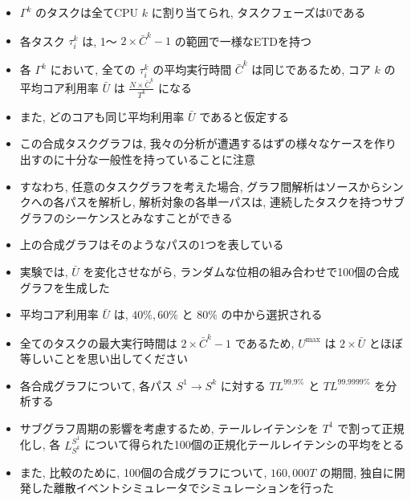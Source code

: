 \begin{frame}{}
    \begin{itemize}
        \item $\Gamma^{k}$ のタスクは全てCPU $k$ に割り当てられ, タスクフェーズは0である
\item 各タスク $\tau_{i}^{k}$ は, 1～ $2 \times \bar{C}^{k}-1$ の範囲で一様なETDを持つ
\item 各 $\Gamma^{k}$ において, 全ての $\tau_{i}^{k}$ の平均実行時間 $\bar{C}^{k}$ は同じであるため, コア $k$ の平均コア利用率 $\bar{U}$ は $\frac{N \times \bar{C}^{k}}{T^{k}}$ になる
\item また, どのコアも同じ平均利用率 $\bar{U}$ であると仮定する
\item この合成タスクグラフは, 我々の分析が遭遇するはずの様々なケースを作り出すのに十分な一般性を持っていることに注意
\item すなわち, 任意のタスクグラフを考えた場合, グラフ間解析はソースからシンクへの各パスを解析し, 解析対象の各単一パスは, 連続したタスクを持つサブグラフのシーケンスとみなすことができる
\item 上の合成グラフはそのようなパスの1つを表している
    \end{itemize}
\end{frame}

\begin{frame}{}
    \begin{itemize}
        \item 実験では, $\bar{U}$ を変化させながら, ランダムな位相の組み合わせで100個の合成グラフを生成した
\item 平均コア利用率 $\bar{U}$ は, $40 \%, 60 \%$ と $80 \%$ の中から選択される
\item 全てのタスクの最大実行時間は $2 \times \bar{C}^{k}-1$ であるため, $U^{\max }$ は $2 \times \bar{U}$ とほぼ等しいことを思い出してください
\item 各合成グラフについて, 各パス $S^{1} \rightarrow S^{k}$ に対する $T L^{99.9 \%}$ と $T L^{99.9999 \%}$ を分析する
\item サブグラフ周期の影響を考慮するため, テールレイテンシを $T^{1}$ で割って正規化し, 各 $L_{S^{k}}^{S^{1}}$ について得られた100個の正規化テールレイテンシの平均をとる
\item また, 比較のために, 100個の合成グラフについて, $160,000 T$ の期間, 独自に開発した離散イベントシミュレータでシミュレーションを行った
    \end{itemize}
\end{frame}

